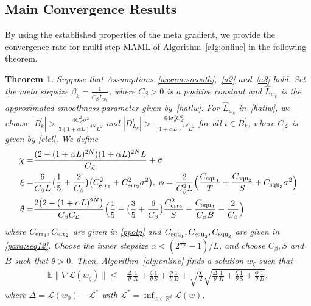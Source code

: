 \documentclass{osudissert96}
\newtheorem{theorem}{Theorem}
\begin{document}
\subsection*{Main Convergence Results}
By using the established properties of the meta gradient, we provide the convergence rate for multi-step MAML of Algorithm~\ref{alg:online} in the following theorem. 
\begin{theorem}\label{th:mainonline}  
	Suppose that  Assumptions~\ref{assum:smooth},~\ref{a2} and~\ref{a3} hold. 
	Set the meta stepsize $\beta_k = \frac{1}{C_\beta \widehat L_{w_k}} $, where  $C_\beta>0$ is a positive constant and $\widehat L_{w_k}$ is the approximated smoothness parameter given by~\cref{hatlw}. For $\widehat L_{w_k}$ in~\cref{hatlw}, we choose $|B_k^\prime| > \frac{4C^2_{\mathcal{L}}\sigma^2}{3(1+\alpha L)^{4N}L^2}$ and $|D_{L_k}^i| > \frac{64\sigma^2_g C_\mathcal{L}^2}{(1+\alpha L)^{4N}L^2}$ for all $i \in B_k^\prime$, where  $C_\mathcal{L}$ is given by \cref{clcl}. We define 
	\begin{align}\label{para:com}
	\chi =&  \frac{(2- (1+\alpha L)^{2N}) (1+\alpha L)^{2N}L}{C_{\mathcal{L}}} + \sigma  \nonumber
	\\\xi =& \frac{6}{C_\beta L}\big( \frac{1}{5} +\frac{2}{C_\beta}   \big)\big( C^2_{{\text{\normalfont err}}_1} +C^2_{{\text{\normalfont err}}_2}\sigma^2\big), \; \phi = \frac{2}{C_\beta^2 L} \Big(  \frac{C_{\text{\normalfont squ}_1}}{T}  +  \frac{C_{\text{\normalfont squ}_2}}{S} + C_{\text{\normalfont squ}_3} \sigma^2 \Big) \nonumber
	\\\theta = &  \frac{2\big(2- (1+\alpha L)^{2N}\big)}{C_\beta C_{\mathcal{L}}}\Big(   \frac{1}{5} - \big(\frac{3}{5} + \frac{6}{C_\beta}\big)\frac{C^2_{{\text{\normalfont err}}_2} }{S} - \frac{C_{\text{\normalfont squ}_3}}{C_\beta B} - \frac{2}{C_\beta}\Big)  %
	\end{align}
    where $C_{{\text{\normalfont err}}_1},C_{{\text{\normalfont err}}_2}$ are given in \cref{ppolp} and $C_{\text{\normalfont squ}_1},C_{\text{\normalfont squ}_2},C_{\text{\normalfont squ}_3} $ are given in \cref{para:seq12}. 
	Choose the inner stepsize $\alpha < (2^{\frac{1}{2N}} - 1)/L$, and choose $C_\beta, S$ and $B$ such that $\theta >0$. 
	Then, Algorithm~\ref{alg:online} finds a solution $w_{\zeta}$ such that 
	\begin{align}\label{c:result}
	\mathbb{E}\|\nabla \mathcal{L}(w_\zeta) \|  \leq &\frac{\Delta}{\theta }\frac{1}{K} +    \frac{\xi}{\theta}\frac{1}{S} +  \frac{\phi }{\theta}\frac{1}{B}  + \sqrt{\frac{\chi}{2} }\sqrt{\frac{\Delta}{\theta }\frac{1}{K}
	+    \frac{\xi}{\theta}\frac{1}{S} +  \frac{\phi }{\theta}\frac{1}{B}},
	\end{align}
	where $\Delta = \mathcal{L}(w_0) - \mathcal{L}^*$ with $\mathcal{L}^*=\inf_{w\in\mathbb{R}^d} \mathcal{L}(w)$.
\end{theorem}
\end{document}
